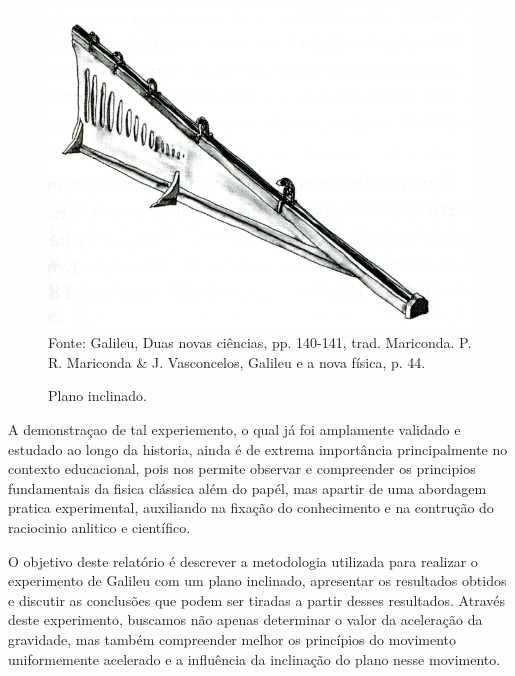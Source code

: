 \documentclass[a4paper, 12pt]{article}
\begin{document}
\begin{figure}[!htpb]
	\centering
	\caption{Plano inclinado.}
	\includegraphics[scale=0.25]{./pictures/planoInclinado.png}
	Fonte: Galileu, Duas novas ciências, pp. 140-141, trad. Mariconda. P. R. Mariconda \& J. Vasconcelos, Galileu e a nova física, p. 44.
\end{figure}

A demonstraçao de tal experiemento, o qual já foi amplamente validado e estudado ao longo da historia, ainda é de extrema importância principalmente no contexto educacional, pois nos permite observar e compreender os principios fundamentais da fisica clássica além do papél, mas apartir de uma abordagem pratica experimental, auxiliando na fixação do conhecimento e na contrução do raciocinio anlitico e científico.

O objetivo deste relatório é descrever a metodologia utilizada para realizar o experimento de Galileu com um plano inclinado, apresentar os resultados obtidos e discutir as conclusões que podem ser tiradas a partir desses resultados. Através deste experimento, buscamos não apenas determinar o valor da aceleração da gravidade, mas também compreender melhor os princípios do movimento uniformemente acelerado e a influência da inclinação do plano nesse movimento.

\end{document}
